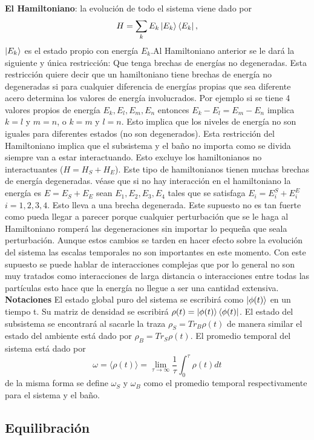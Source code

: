\textbf{El Hamiltoniano}: la evolución de todo el sistema viene dado por 
\begin{equation}
H= \sum_{k} E_{k} \ket{E_{k}} \bra{E_{k}},
\end{equation}
$\ket{E_{k}}$ es el estado propio con energía $E_{k}$.Al Hamiltoniano anterior se le dará la siguiente y única restricción: Que tenga brechas de energías no degeneradas. Esta restricción quiere decir que  un hamiltoniano tiene brechas de energía no degeneradas si para cualquier diferencia de energías propias que sea diferente acero determina los valores de energía involucrados. Por ejemplo si se tiene 4 valores propios de energía $E_{k}, E_{l},E_{m},E_{n}$ entonces $E_{k}-E_{l}=E_{m}-E_{n} $ implica $k=l$ y $m=n$, o $k=m$ y $l=n$. Esto implica que los niveles de energía no son iguales para diferentes estados (no son degenerados).
Esta restricción del Hamiltoniano implica que el subsistema y el baño no importa como se divida siempre van a estar interactuando. Esto excluye los hamiltonianos no interactuantes ($H=H_{S}+H_{E}$). Este tipo de hamiltonianos tienen muchas brechas de energía degeneradas. véase que si no hay interacción en el hamiltoniano la energía es $E=E_{S}+E_{E}$ sean $E_{1},E_{2},E_{3},E_{4}$ tales que se satisfaga $E_{i}=E_{i}^{S}+E_{i}^{E}$ $i=1,2,3,4$. Esto lleva a una brecha degenerada. Este supuesto no es tan fuerte como pueda llegar a parecer porque cualquier perturbación que se le haga al Hamiltoniano romperá las degeneraciones sin importar lo pequeña que seala perturbación. Aunque estos cambios se tarden en hacer efecto sobre la evolución del sistema las escalas temporales no son importantes en este momento. Con este supuesto se puede hablar de interacciones complejas que por lo general no son muy tratados como interacciones de larga distancia o interacciones entre todas las partículas esto hace que la energía no llegue a ser una cantidad extensiva.
\textbf{Notaciones} El estado global puro del sistema se escribirá como $\ket{\phi(t)}$ en un tiempo t. Su matriz de densidad se escribirá $\rho(t)=\ket{\phi(t)}\bra{\phi(t)}$. El estado del subsistema se encontrará al sacarle la traza $\rho_{S}=Tr_{B} \rho(t)$ de manera similar el estado del ambiente está dado por $\rho_{B}=Tr_{S} \rho(t)$. El promedio temporal del sistema está dado por 
\begin{equation}
\omega= \langle \rho(t) \rangle= \lim_{\tau \to \infty} \frac{1}{\tau} \int_{0}^{\tau} \rho (t)dt
\end{equation}
de la misma forma se define $\omega_{S}$ y $\omega_{B}$ como el promedio temporal respectivamente para el sistema y el baño.
\subsection{Equilibración}










